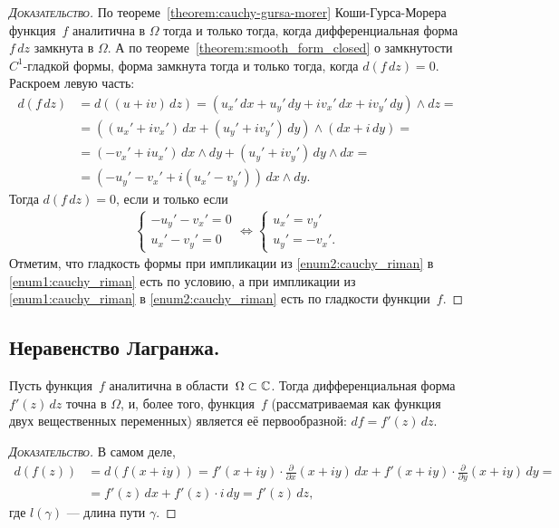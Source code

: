 \documentclass[../complex-analysis.tex]{subfiles}
\begin{document}
\begin{proof}[\normalfont\textsc{Доказательство}]
 По теореме~\ref{theorem:cauchy-gursa-morer} Коши-Гурса-Морера функция~$ f $ аналитична в $ \Omega $ тогда и только тогда, когда дифференциальная форма~$ f \, dz $ замкнута в $ \Omega $. А по теореме~\ref{theorem:smooth_form_closed} о замкнутости $ C^{1} $-гладкой формы, форма замкнута тогда и только тогда, когда $ d(f\,dz) = 0 $. Раскроем левую часть:
 \begin{align*}
  d(f\,dz) &= d((u+iv)\,dz) = (u_x'\,dx + u_y'\,dy + iv_x'\,dx + iv_y'\,dy)\land dz = \\
  &= ((u_x' + iv_x')\,dx + (u_y' + iv_y')\,dy) \land (dx + i\,dy) = \\
  &= (-v_x' + iu_x')\,dx \land dy + (u_y' + iv_y')\,dy \land dx = \\
  &= (-u_y' - v_x' + i(u_x' - v_y'))\,dx\land dy.
 \end{align*} Тогда $ d(f\,dz) = 0 $, если и только если
 \begin{align*}
  \begin{cases}
   -u_y' - v_x' = 0\\
   u_x' - v_y' = 0
  \end{cases} \iff
  \begin{cases}
   u_x' = v_y'\\
   u_y' = -v_x'.
  \end{cases} 
 \end{align*} Отметим, что гладкость формы при импликации из \ref{enum2:cauchy_riman} в \ref{enum1:cauchy_riman} есть по условию, а при импликации из \ref{enum1:cauchy_riman} в \ref{enum2:cauchy_riman} есть по гладкости функции~$ f $.
\end{proof}

\subsection{Неравенство Лагранжа.}

\begin{lm}
 \label{lemma:derivative_of_analytic_f_is_exact_form}
 Пусть функция~$ f $ аналитична в области~$ \Omega \subset \mathbb{C} $. Тогда дифференциальная форма~$ f'(z)\,dz $ точна в $ \Omega $, и, более того, функция~$ f $ (рассматриваемая как функция двух вещественных переменных) является её первообразной: $ df = f'(z)\,dz $.
\end{lm}
\begin{proof}[\normalfont\textsc{Доказательство}]
 В самом деле,
 \begin{align*}
  d(f(z)) &= d(f(x + iy)) = f'(x+iy) \cdot \frac{\partial}{\partial x}(x+iy)\,dx + f'(x+iy) \cdot \frac{\partial}{\partial y}(x+iy)\,dy = \\
  &= f'(z) \, dx + f'(z) \cdot i\,dy = f'(z)\,dz,
 \end{align*} где $ l(\gamma) $ --- длина пути $ \gamma $.
\end{proof}
\end{document}
